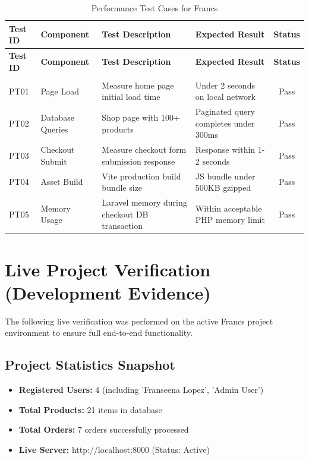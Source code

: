 \renewcommand{\arraystretch}{1.3}
\begin{longtable}{|p{1.5cm}|p{2.5cm}|p{4cm}|p{3.5cm}|c|}
    \hline
    \textbf{Test ID} & \textbf{Component} & \textbf{Test Description} & \textbf{Expected Result} & \textbf{Status} \\
    \hline
    \endfirsthead
    \hline
    \textbf{Test ID} & \textbf{Component} & \textbf{Test Description} & \textbf{Expected Result} & \textbf{Status} \\
    \hline
    \endhead
    \hline
    \endfoot
    \hline
    \caption{Performance Test Cases for Francs} \label{tab:performance_tests} \\
    \endlastfoot
    PT01 & Page Load & \raggedright Measure home page initial load time & \raggedright Under 2 seconds on local network & Pass \\
    \hline
    PT02 & Database Queries & \raggedright Shop page with 100+ products & \raggedright Paginated query completes under 300ms & Pass \\
    \hline
    PT03 & Checkout Submit & \raggedright Measure checkout form submission response & \raggedright Response within 1-2 seconds & Pass \\
    \hline
    PT04 & Asset Build & \raggedright Vite production build bundle size & \raggedright JS bundle under 500KB gzipped & Pass \\
    \hline
    PT05 & Memory Usage & \raggedright Laravel memory during checkout DB transaction & \raggedright Within acceptable PHP memory limit & Pass \\
    \hline
\end{longtable}
\section{Live Project Verification (Development Evidence)}
The following live verification was performed on the active Francs project environment to ensure full end-to-end functionality.

\subsection{Project Statistics Snapshot}
\begin{itemize}
    \item \textbf{Registered Users:} 4 (including 'Franseena Lopez', 'Admin User')
    \item \textbf{Total Products:} 21 items in database
    \item \textbf{Total Orders:} 7 orders successfully processed
    \item \textbf{Live Server:} http://localhost:8000 (Status: Active)
\end{itemize}

